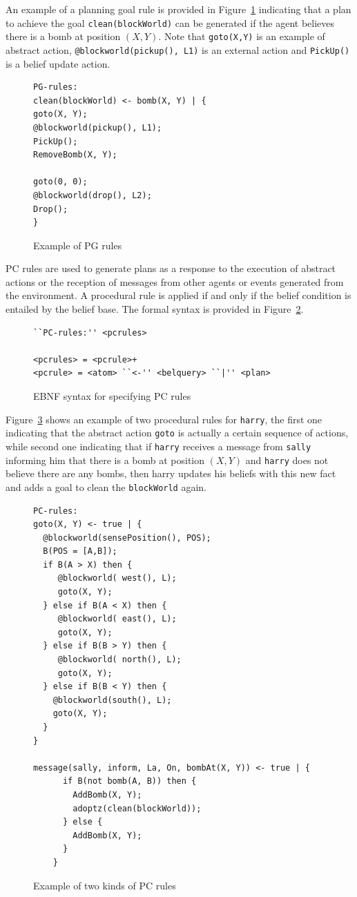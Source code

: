 \documentclass[a4paper]{article}
\begin{document}
An example of a planning goal rule is provided in Figure~\ref{fig:example_pgrules} indicating that a plan to achieve the goal \texttt{clean(blockWorld)} can be generated if the agent believes there is a bomb at position $(X,Y)$. Note that \texttt{goto(X,Y)} is an example of abstract action, \texttt{@blockworld(pickup(), L1)} is an external action and \texttt{PickUp()} is a belief update action.

\begin{figure}[htp]
\begin{verbatim}
PG-rules:
clean(blockWorld) <- bomb(X, Y) | { 
goto(X, Y);
@blockworld(pickup(), L1);
PickUp();
RemoveBomb(X, Y);

goto(0, 0);
@blockworld(drop(), L2);
Drop();
}
\end{verbatim}
\caption{Example of PG rules}
\label{fig:example_pgrules}
\end{figure}

PC rules are used to generate plans as a response to the execution of abstract actions or the reception of messages from other agents or events generated from the environment. A procedural rule is applied if and only if the belief condition is entailed by the belief base. The formal syntax is provided in Figure~\ref{fig:ebnf_pcrules}.

\begin{figure}[htp]
\begin{verbatim}
``PC-rules:'' <pcrules>

<pcrules> = <pcrule>+
<pcrule> = <atom> ``<-'' <belquery> ``|'' <plan>
\end{verbatim}
\caption{EBNF syntax for specifying PC rules}
\label{fig:ebnf_pcrules}
\end{figure}

Figure~\ref{fig:example_pcrules} shows an example of two procedural rules for \texttt{harry}, the first one indicating that the abstract action \texttt{goto} is actually a certain sequence of actions, while second one indicating that if \texttt{harry} receives a message from \texttt{sally} informing him that there is a bomb at position $(X,Y)$ and \texttt{harry} does not believe there are any bombs, then harry updates his beliefs with this new fact and adds a goal to clean the \texttt{blockWorld} again.

\begin{figure}[htp]
\begin{verbatim}
PC-rules:
goto(X, Y) <- true | {
  @blockworld(sensePosition(), POS);
  B(POS = [A,B]);
  if B(A > X) then {
     @blockworld( west(), L);
     goto(X, Y);
  } else if B(A < X) then {
     @blockworld( east(), L);
     goto(X, Y);
  } else if B(B > Y) then {
     @blockworld( north(), L);
     goto(X, Y);
  } else if B(B < Y) then {
    @blockworld(south(), L);
    goto(X, Y);
  }
}

message(sally, inform, La, On, bombAt(X, Y)) <- true | {
	  if B(not bomb(A, B)) then { 
	    AddBomb(X, Y);
	    adoptz(clean(blockWorld));
	  } else { 
	    AddBomb(X, Y);
	  }
	}
\end{verbatim}
\caption{Example of two kinds of PC rules}
\label{fig:example_pcrules}
\end{figure}
\end{document}
